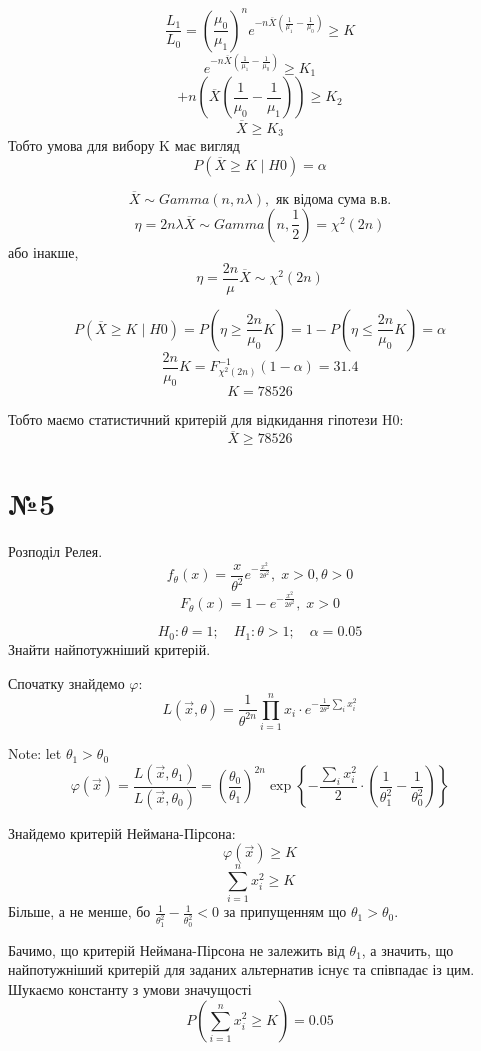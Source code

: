 \documentclass[11pt, a4paper]{article} %
\begin{document}
$$\frac{L_1}{L_0} = \left(\frac{\mu_0}{\mu_1}\right)^n e^{-n \overline X \left(\frac{1}{\mu_1} - \frac{1}{\mu_0}\right)} \ge K$$
$$e^{-n \overline X \left(\frac{1}{\mu_1} - \frac{1}{\mu_0}\right)} \ge K_1$$
$$+n \left(\overline X \left(\frac{1}{\mu_0} - \frac{1}{\mu_1}\right)\right) \ge K_2$$
$$\overline X \ge K_3$$
Тобто умова для вибору K має вигляд
$$P(\overline X \ge K \;|\; H0) = \alpha$$

$$\overline X \sim Gamma(n, n \lambda), \text{ як відома сума в.в.}$$
$$\eta = 2 n \lambda \overline X \sim Gamma(n, \frac{1}{2}) = \chi^2(2n)$$
або інакше, 
$$\eta = \frac{2n}{\mu} \overline X \sim \chi^2(2n)$$

$$P(\overline X \ge K \;|\; H0) = P(\eta \ge \frac{2n}{\mu_0} K) = 1 - P(\eta \le \frac{2n}{\mu_0} K) = \alpha$$
$$\frac{2n}{\mu_0} K = F_{\chi^2(2n)}^{-1}(1-\alpha) = 31.4$$
$$K = 78526$$

\begin{mdframed}[style=ans]
    Тобто маємо статистичний критерій для відкидання гіпотези H0:
    $$\overline X \ge 78526$$
\end{mdframed}
\pagebreak

\section*{№5}
\begin{mdframed}
    Розподіл Релея.
    $$f_\theta(x) = \frac{x}{\theta^2} e^{-\frac{x^2}{2\theta^2}}, \; x>0, \theta>0$$
    $$F_\theta(x) = 1 - e^{-\frac{x^2}{2\theta^2}}, \; x>0$$

    $$H_0: \theta = 1; \quad H_1: \theta > 1; \quad \alpha = 0.05$$
    Знайти найпотужніший критерій.
\end{mdframed}

Спочатку знайдемо $\varphi$:
$$L(\vec x, \theta) = \frac{1}{\theta^{2n}}\prod_{i=1}^n x_i \cdot e^{-\frac{1}{2\theta^2} \sum_i x_i^2}$$

Note: let $\theta_1 > \theta_0$
$$\varphi(\vec x) = \frac{L(\vec x, \theta_1)}{L(\vec x, \theta_0)} =  
\left(\frac{\theta_0}{\theta_1}\right)^{2n} \operatorname{exp}\left\{-\frac{\sum_i x_i^2}{2} \cdot \left(\frac{1}{\theta_1^2} - \frac{1}{\theta_0^2}\right)\right\}$$

Знайдемо критерій Неймана-Пірсона:
$$\varphi(\vec x) \ge K$$
$$\sum_{i=1}^n x_i^2 \ge K$$
Більше, а не менше, бо $\frac{1}{\theta_1^2} - \frac{1}{\theta_0^2} < 0$ за припущенням що $\theta_1 > \theta_0$.

Бачимо, що критерій Неймана-Пірсона не залежить від $\theta_1$, а значить, що найпотужніший критерій для заданих альтернатив 
існує та співпадає із цим. 
Шукаємо константу з умови значущості
$$P(\sum_{i=1}^n x_i^2 \ge K) = 0.05$$
\end{document}

